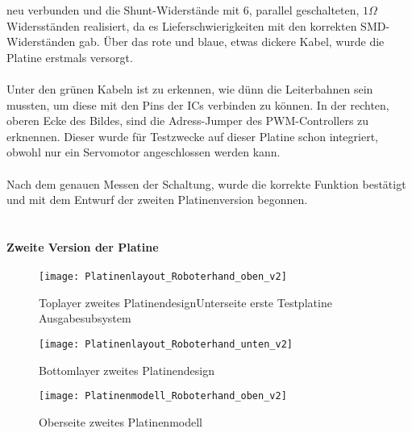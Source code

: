\documentclass[titlepage,12pt,twoside]{article}
\begin{document}
neu verbunden und die Shunt-Widerstände mit 6, parallel geschalteten, $1\Omega$ Widersständen realisiert, da es Lieferschwierigkeiten mit den korrekten SMD-Widerständen gab. Über das rote und blaue, etwas dickere Kabel, wurde die Platine erstmals versorgt. \\
\\
Unter den grünen Kabeln ist zu erkennen, wie dünn die Leiterbahnen sein mussten, um diese mit den Pins der ICs verbinden zu können. In der rechten, oberen Ecke des Bildes, sind die Adress-Jumper des PWM-Controllers zu erknennen. Dieser wurde für Testzwecke 
auf dieser Platine schon integriert, obwohl nur ein Servomotor angeschlossen werden kann. \\
\\
Nach dem genauen Messen der Schaltung, wurde die korrekte Funktion bestätigt und mit dem Entwurf der zweiten Platinenversion begonnen. \\
\\

\paragraph{Zweite Version der Platine}
\hfill \break
\hfill \break

\begin{figure}[H]
	\begin{center}
		\scalebox{0.8}
		{\texttt{[image: Platinenlayout\_Roboterhand\_oben\_v2]}}
		\caption{Toplayer zweites PlatinendesignUnterseite erste Testplatine Ausgabesubsystem}
		\label{fig:Platinenlayout_Roboterhand_oben_v2}	
	\end{center}
\end{figure}
\hfill \break

\begin{figure}[H]
	\begin{center}
		\scalebox{0.8}
		{\texttt{[image: Platinenlayout\_Roboterhand\_unten\_v2]}}
		\caption{Bottomlayer zweites Platinendesign}
		\label{fig:Platinenlayout_Roboterhand_unten_v2}		
	\end{center}
\end{figure}
\hfill \break

\begin{figure}[H]
	\begin{center}
		\scalebox{0.8}
		{\texttt{[image: Platinenmodell\_Roboterhand\_oben\_v2]}}
		\caption{Oberseite zweites Platinenmodell}
		\label{fig:Platinenmodell_Roboterhand_oben_v2}		
	\end{center}
\end{figure}
\hfill \break
\end{document}
